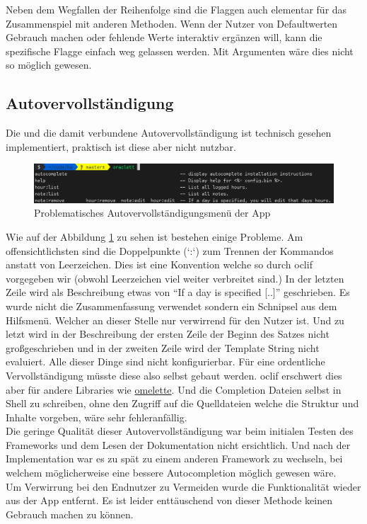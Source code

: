 \documentclass[oneside,bibliography=totocnumbered,BCOR=5mm]{scrbook}
\begin{document}
Neben dem Wegfallen der Reihenfolge sind die Flaggen auch elementar für das
Zusammenspiel mit anderen Methoden. Wenn der Nutzer von Defaultwerten Gebrauch
machen oder fehlende Werte interaktiv ergänzen will, kann die spezifische Flagge
einfach weg gelassen werden. Mit Argumenten wäre dies nicht so möglich gewesen.

\subsection{Autovervollständigung}
\label{sec:autocomplete}

Die  und die damit verbundene Autovervollständigung ist
technisch gesehen implementiert, praktisch ist diese aber nicht nutzbar.

\begin{figure}
  \centering
  \includegraphics[scale=0.5]{apps-autocomplete.png}
  \caption{Problematisches Autovervollständigungsmenü der App}
  \label{fig:apps-autocomplete}
\end{figure}

Wie auf der Abbildung \ref{fig:apps-autocomplete} zu sehen ist bestehen einige
Probleme. Am offensichtlichsten sind die Doppelpunkte (`:`) zum Trennen
der Kommandos anstatt von Leerzeichen. Dies ist eine Konvention welche
so durch oclif vorgegeben wir (obwohl Leerzeichen viel weiter verbreitet
sind.) In der letzten Zeile wird als Beschreibung etwas von ``If a day is
specified [..]'' geschrieben. Es wurde nicht die Zusammenfassung verwendet
sondern ein Schnipsel aus dem Hilfsmenü. Welcher an dieser Stelle nur
verwirrend für den Nutzer ist. Und zu letzt wird in der Beschreibung der
ersten Zeile der Beginn des Satzes nicht großgeschrieben und in der zweiten
Zeile wird der Template String nicht evaluiert. Alle dieser Dinge sind nicht
konfigurierbar. Für eine ordentliche Vervollständigung müsste diese also
selbst gebaut werden. oclif erschwert dies aber für andere Libraries wie
\href{https://github.com/f/omelette/issues/52}{omelette}. Und die Completion
Dateien selbst in Shell zu schreiben, ohne den Zugriff auf die Quelldateien
welche die Struktur und Inhalte vorgeben, wäre sehr fehleranfällig.
\\
Die geringe Qualität dieser Autovervollständigung war beim initialen Testen
des Frameworks und dem Lesen der Dokumentation nicht ersichtlich. Und nach
der Implementation war es zu spät zu einem anderen Framework zu wechseln, bei
welchem möglicherweise eine bessere Autocompletion möglich gewesen wäre.
\\
Um Verwirrung bei den Endnutzer zu Vermeiden wurde die Funktionalität wieder aus
der App entfernt. Es ist leider enttäuschend von dieser Methode keinen Gebrauch
machen zu können.
\end{document}
